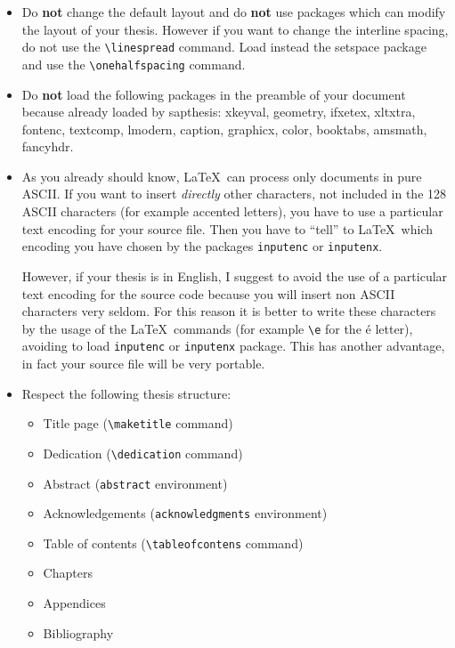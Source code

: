 \documentclass[a5paper,11pt]{article}
\newcommand{\bs}{\textbackslash}
\newcommand{\sq}{\textquotesingle}
\begin{document}
\begin{itemize}

\item Do \textbf{not} change the default layout and do \textbf{not} use packages which can modify the layout of your thesis. However if you want to change the interline spacing, do not use the \texttt{\bs linespread} command. Load instead the \textsf{setspace} package and use the \texttt{\bs onehalfspacing} command.

\item Do \textbf{not} load the following packages in the preamble of your document because already loaded by \textsf{sapthesis}: \textsf{xkeyval}, \textsf{geometry}, \textsf{ifxetex}, \textsf{xltxtra}, \textsf{fontenc}, \textsf{textcomp}, \textsf{lmodern}, \textsf{caption}, \textsf{graphicx}, \textsf{color}, \textsf{booktabs}, \textsf{amsmath}, \textsf{fancyhdr}.

\item As you already should know, \LaTeX\ can process only documents
in pure ASCII. If you want to insert \emph{directly} other characters, not included in the 128 ASCII
characters (for example accented letters), you have to use a particular text encoding for your source file. Then you have to ``tell'' to \LaTeX\ which encoding you have chosen by the packages \texttt{inputenc} or \texttt{inputenx}.

However, if your thesis is in English, I suggest to avoid the use of a particular text encoding for the source code because  you will insert non ASCII characters very seldom. For this reason it is better to write these characters by the usage of the \LaTeX\ commands (for example \texttt{\bs\sq e} for the \'e letter), avoiding to load \texttt{inputenc} or \texttt{inputenx} package. This has another advantage, in fact your source file will be very portable.

\item Respect the following thesis structure:

\begin{itemize}
\item Title page (\texttt{\bs maketitle} command)
\item Dedication (\texttt{\bs dedication} command)
\item Abstract (\texttt{abstract} environment)
\item Acknowledgements (\texttt{acknowledgments} environment)
\item Table of contents (\texttt{\bs tableofcontens} command)
\item Chapters
\item Appendices
\item Bibliography
\end{itemize}


\end{itemize}
\end{document}

